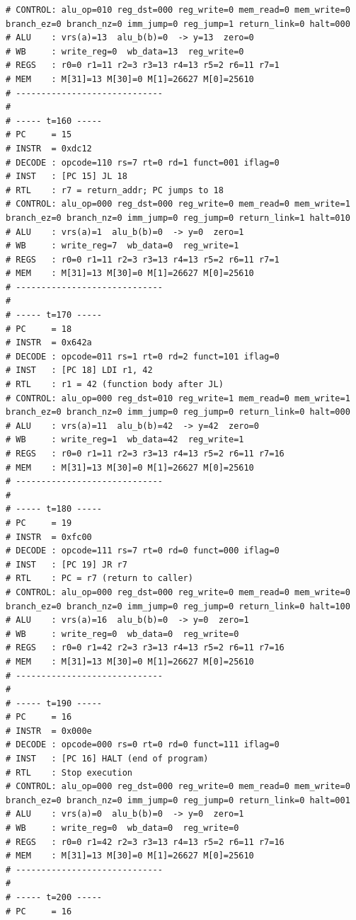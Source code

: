 \documentclass[12pt]{report}
\begin{document}
\begin{lstlisting}
# CONTROL: alu_op=010 reg_dst=000 reg_write=0 mem_read=0 mem_write=0 branch_ez=0 branch_nz=0 imm_jump=0 reg_jump=1 return_link=0 halt=000
# ALU    : vrs(a)=13  alu_b(b)=0  -> y=13  zero=0
# WB     : write_reg=0  wb_data=13  reg_write=0
# REGS   : r0=0 r1=11 r2=3 r3=13 r4=13 r5=2 r6=11 r7=1
# MEM    : M[31]=13 M[30]=0 M[1]=26627 M[0]=25610
# -----------------------------
# 
# ----- t=160 -----
# PC     = 15
# INSTR  = 0xdc12
# DECODE : opcode=110 rs=7 rt=0 rd=1 funct=001 iflag=0
# INST   : [PC 15] JL 18
# RTL    : r7 = return_addr; PC jumps to 18
# CONTROL: alu_op=000 reg_dst=000 reg_write=0 mem_read=0 mem_write=1 branch_ez=0 branch_nz=0 imm_jump=0 reg_jump=0 return_link=1 halt=010
# ALU    : vrs(a)=1  alu_b(b)=0  -> y=0  zero=1
# WB     : write_reg=7  wb_data=0  reg_write=1
# REGS   : r0=0 r1=11 r2=3 r3=13 r4=13 r5=2 r6=11 r7=1
# MEM    : M[31]=13 M[30]=0 M[1]=26627 M[0]=25610
# -----------------------------
# 
# ----- t=170 -----
# PC     = 18
# INSTR  = 0x642a
# DECODE : opcode=011 rs=1 rt=0 rd=2 funct=101 iflag=0
# INST   : [PC 18] LDI r1, 42
# RTL    : r1 = 42 (function body after JL)
# CONTROL: alu_op=000 reg_dst=010 reg_write=1 mem_read=0 mem_write=1 branch_ez=0 branch_nz=0 imm_jump=0 reg_jump=0 return_link=0 halt=000
# ALU    : vrs(a)=11  alu_b(b)=42  -> y=42  zero=0
# WB     : write_reg=1  wb_data=42  reg_write=1
# REGS   : r0=0 r1=11 r2=3 r3=13 r4=13 r5=2 r6=11 r7=16
# MEM    : M[31]=13 M[30]=0 M[1]=26627 M[0]=25610
# -----------------------------
# 
# ----- t=180 -----
# PC     = 19
# INSTR  = 0xfc00
# DECODE : opcode=111 rs=7 rt=0 rd=0 funct=000 iflag=0
# INST   : [PC 19] JR r7
# RTL    : PC = r7 (return to caller)
# CONTROL: alu_op=000 reg_dst=000 reg_write=0 mem_read=0 mem_write=0 branch_ez=0 branch_nz=0 imm_jump=0 reg_jump=0 return_link=0 halt=100
# ALU    : vrs(a)=16  alu_b(b)=0  -> y=0  zero=1
# WB     : write_reg=0  wb_data=0  reg_write=0
# REGS   : r0=0 r1=42 r2=3 r3=13 r4=13 r5=2 r6=11 r7=16
# MEM    : M[31]=13 M[30]=0 M[1]=26627 M[0]=25610
# -----------------------------
# 
# ----- t=190 -----
# PC     = 16
# INSTR  = 0x000e
# DECODE : opcode=000 rs=0 rt=0 rd=0 funct=111 iflag=0
# INST   : [PC 16] HALT (end of program)
# RTL    : Stop execution
# CONTROL: alu_op=000 reg_dst=000 reg_write=0 mem_read=0 mem_write=0 branch_ez=0 branch_nz=0 imm_jump=0 reg_jump=0 return_link=0 halt=001
# ALU    : vrs(a)=0  alu_b(b)=0  -> y=0  zero=1
# WB     : write_reg=0  wb_data=0  reg_write=0
# REGS   : r0=0 r1=42 r2=3 r3=13 r4=13 r5=2 r6=11 r7=16
# MEM    : M[31]=13 M[30]=0 M[1]=26627 M[0]=25610
# -----------------------------
# 
# ----- t=200 -----
# PC     = 16

\end{lstlisting}
\end{document}
